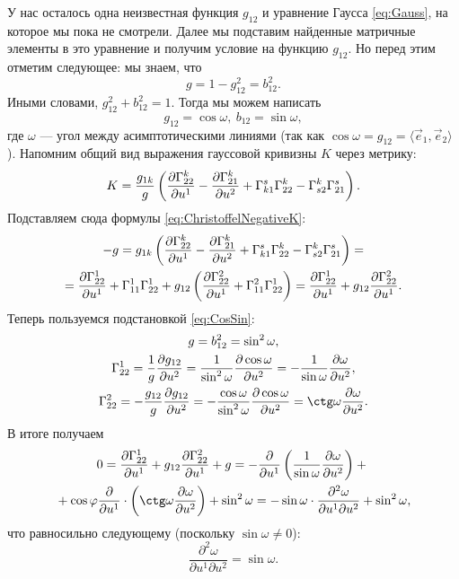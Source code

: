 У нас осталось одна неизвестная функция $g_{12}$ и уравнение Гаусса \eqref{eq:Gauss}, на которое мы пока не смотрели. Далее мы подставим найденные матричные элементы в это уравнение и получим условие на функцию $g_{12}$. Но перед этим отметим следующее: мы знаем, что
\[
	g = 1 - g_{12}^2 = b_{12}^2.
\]
Иными словами, $g_{12}^2 + b_{12}^2 = 1$. Тогда мы можем написать
\begin{equation} \label{eq:CosSin}
	g_{12} = \cos\omega,\ b_{12} = \sin\omega,
\end{equation}
где $\omega$ --- угол между асимптотическими линиями (так как $\cos\omega = g_{12} = \langle\vec{e}_1, \vec{e}_2\rangle$). Напомним общий вид выражения гауссовой кривизны $K$ через метрику:
\[
	K = \frac{g_{1k}}{g}\left(\frac{\partial\Gamma^k_{22}}{\partial u^1} - \frac{\partial\Gamma_{21}^k}{\partial u^2} + \Gamma_{k1}^s\Gamma^k_{22} - \Gamma_{s2}^k\Gamma_{21}^s\right).
\]
Подставляем сюда формулы \eqref{eq:ChristoffelNegativeK}:
\begin{multline*}
	-g = g_{1k}\left(\frac{\partial\Gamma^k_{22}}{\partial u^1} - \frac{\partial\Gamma_{21}^k}{\partial u^2} + \Gamma_{k1}^s\Gamma^k_{22} - \Gamma_{s2}^k\Gamma_{21}^s\right) =\\ = \frac{\partial\Gamma_{22}^1}{\partial u^1} + \Gamma_{11}^1\Gamma_{22}^1 + g_{12}\left(\frac{\partial \Gamma_{22}^2}{\partial u^1} + \Gamma_{11}^2\Gamma_{22}^1\right) = \frac{\partial\Gamma_{22}^1}{\partial u^1} + g_{12}\frac{\partial\Gamma_{22}^2}{\partial u^1}.
\end{multline*}
Теперь пользуемся подстановкой \eqref{eq:CosSin}:
\begin{gather*}
	g = b_{12}^2 = \sin^2\omega,\\
	\Gamma_{22}^1 = \frac{1}{g}\frac{\partial g_{12}}{\partial u^2} = \frac{1}{\sin^2\omega}\frac{\partial\cos\omega}{\partial u^2} = -\frac{1}{\sin\omega}\frac{\partial\omega}{\partial u^2},\\
	\Gamma_{22}^2 = -\frac{g_{12}}{g}\frac{\partial g_{12}}{\partial u^2} = -\frac{\cos\omega}{\sin^2\omega}\frac{\partial\cos\omega}{\partial u^2} = \ctg\omega\frac{\partial\omega}{\partial u^2}.
\end{gather*}
В итоге получаем
\begin{multline*}
	0 = \frac{\partial\Gamma_{22}^1}{\partial u^1} + g_{12}\frac{\partial\Gamma_{22}^2}{\partial u^1} + g = -\frac{\partial}{\partial u^1}\br{\frac{1}{\sin\omega}\frac{\partial\omega}{\partial u^2}} + {}\\{} + \cos\varphi\frac{\partial}{\partial u^1} \cdot \br{\ctg\omega\frac{\partial\omega}{\partial u^2}} + \sin^2\omega = -\sin\omega \cdot \frac{\partial^2\omega}{\partial u^1\partial u^2} + \sin^2\omega,
\end{multline*}
что равносильно следующему (поскольку $\sin\omega \ne 0$):
\begin{equation} \label{eq:sinGordon}
	\frac{\partial^2\omega}{\partial u^1\partial u^2} = \sin\omega.
\end{equation}

